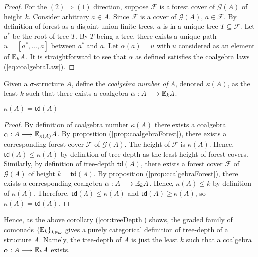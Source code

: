 \begin{prop}
\begin{proof}
For the $(2) \Rightarrow (1)$ direction, suppose $\mathcal{F}$ is a forest cover of $\mathcal{G}(A)$ of height $k$. Consider arbitrary $a \in A$. Since $\mathcal{F}$ is a cover of $\mathcal{G}(A)$, $a \in \mathcal{F}$. By definition of forest as a disjoint union finite trees, $a$ is in a unique tree $T \subseteq \mathcal{F}$. Let $a^{*}$ be the root of tree $T$. By $T$ being a tree, there exists a unique path $u = [a^{*},\dots,a]$ between $a^{*}$ and $a$. Let $\alpha(a) = u$ with $u$ considered as an element of ${\mathbb{E}_{k}A}$. It is straightforward to see that $\alpha$ as defined satisfies the coalgebra laws (\ref{eq:coalgebraLaw}). 
\end{proof}
\label{prop:coalgebraForest}
\begin{defn}
Given a $\sigma$-structure $A$, define the \textit{coalgebra number of $A$}, denoted $\kappa(A)$, as the least $k$ such that there exists a coalgebra $\alpha:A \longrightarrow {\mathbb{E}_{k}A}$. 
\end{defn}
\begin{cor}
$\kappa(A) = \mathsf{td}(A)$
\begin{proof}
By definition of coalgebra number $\kappa(A)$ there exists a coalgebra $\alpha:A \longrightarrow {\mathbb{E}_{\kappa(A)}A}$. By proposition (\ref{prop:coalgebraForest}), there exists a corresponding forest cover $\mathcal{F}$ of $\mathcal{G}(A)$. The height of $\mathcal{F}$ is $\kappa(A)$. Hence, $\mathsf{td}(A) \leq \kappa(A)$ by definition of tree-depth as the least height of forest covers. Similarly, by definition of tree-depth $\mathsf{td}(A)$, there exists a forest cover $\mathcal{F}$ of $\mathcal{G}(A)$ of height $k = \mathsf{td}(A)$. By proposition (\ref{prop:coalgebraForest}), there exists a corresponding coalgebra $\alpha:A \longrightarrow {\mathbb{E}_{k}A}$. Hence, $\kappa(A) \leq k$ by definition of $\kappa(A)$. Therefore, $\mathsf{td}(A) \leq \kappa(A)$ and $\mathsf{td}(A) \geq \kappa(A)$, so $\kappa(A) = \mathsf{td}(A)$.      
\end{proof}
\label{cor:treeDepth}
\end{cor}
\end{prop}
Hence, as the above corollary (\ref{cor:treeDepth}) shows, the graded family of comonads $\{{\mathbb{E}_{k}\}}_{k \in \omega}$ gives a purely categorical definition of tree-depth of a structure $A$. Namely, the tree-depth of $A$ is just the least $k$ such that a coalgebra $\alpha:A \longrightarrow {\mathbb{E}_{k}A}$ exists. 
